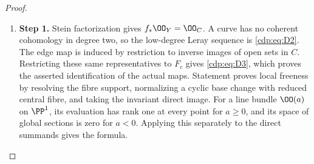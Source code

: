 \begin{proof}
\begin{enumerate}[label={$\langle1\rangle$\arabic*.},leftmargin=*]
\item 
\noindent\textbf{Step 1.} Stein factorization gives $f_*\OO_Y=\OO_C$. A curve has no coherent
cohomology in degree two, so the low-degree Leray sequence is \eqref{cdp:eq:D2}.
The edge map is induced by restriction to inverse images of open
sets in $C$. Restricting these same representatives to $F_c$ gives
\eqref{cdp:eq:D3}, which proves the asserted identification of the actual maps.
Statement  proves local freeness by resolving the fibre support,
normalizing a cyclic base change with reduced central fibre, and
taking the invariant direct image. For a line bundle
$\OO(a)$ on $\PP^1$, its evaluation has rank one at every point
for $a\geq0$, and its space of global sections is zero for $a<0$.
Applying this separately to the direct summands gives the formula.

\end{enumerate}
\end{proof}
